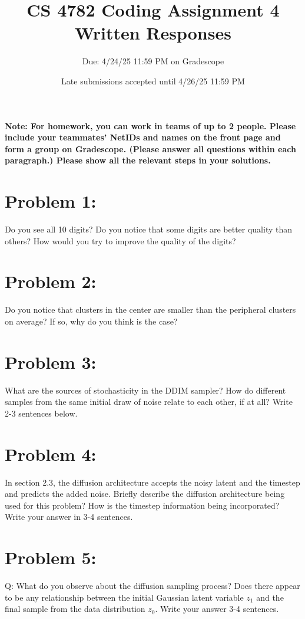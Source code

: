 \documentclass{article}
\title{CS 4782 Coding Assignment 4 Written Responses\vspace{-10pt}}
\author{Due: 4/24/25 11:59 PM on Gradescope}
\date{Late submissions accepted until 4/26/25 11:59 PM}
\begin{document}
    \maketitle
    \textbf{Note: For homework, you can work in teams of up to 2 people. Please include your teammates’ NetIDs and names on the front page and form a group on Gradescope. (Please answer all questions within each paragraph.) Please show all the relevant steps in your solutions. }
\maketitle
\section*{Problem 1:}

Do you see all 10 digits? Do you notice that some digits are better quality than others? How would you try to improve the quality of the digits?

\section*{Problem 2:}

Do you notice that clusters in the center are smaller than the peripheral clusters on average? If so, why do you think is the case?

\section*{Problem 3:}

What are the sources of stochasticity in the DDIM sampler? How do different samples from the same initial draw of noise relate to each other, if at all? Write 2-3 sentences below.

\section*{Problem 4:}

In section 2.3, the diffusion architecture accepts the noisy latent and the timestep and predicts the added noise. Briefly describe the diffusion architecture being used for this problem? How is the timestep information being incorporated? Write your answer in 3-4 sentences.

\section*{Problem 5:}
Q: What do you observe about the diffusion sampling process? Does there appear to be any relationship between the initial Gaussian latent variable $z_1$ and the final sample from the data distribution $z_0$. Write your answer 3-4 sentences.
\end{document}
